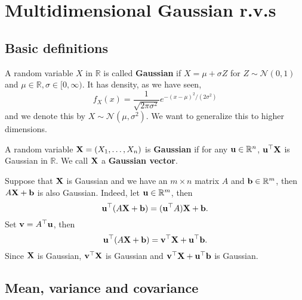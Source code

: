 \section{Multidimensional Gaussian r.v.s}
\subsection{Basic definitions}
\begin{definition}
    A random variable $X$ in $\mathbb R$ is called \textbf{Gaussian} if $X=\mu+\sigma Z$ for $Z\sim\mathcal N(0,1)$ and $ \mu\in \mathbb{R}, \sigma\in [0,\infty) $.
    It has density, as we have seen,
    $$f_X(x)=\frac{1}{\sqrt{2\pi\sigma^2}}e^{-(x-\mu)^2/(2\sigma^2)}$$
    and we denote this by $X\sim\mathcal N(\mu,\sigma^2)$.
    We want to generalize this to higher dimensions.
\end{definition}
\begin{definition}
    A random variable ${\bf X}=(X_1,\ldots,X_n)$ is \textbf{Gaussian} if for any ${\bf u}\in\mathbb R^n$, ${\bf u}^\top {\bf X}$ is Gaussian in $\mathbb R$.
    We call ${\bf X}$ a \textbf{Gaussian vector}.
\end{definition}

\begin{example}
    Suppose that $ {\bf X} $ is Gaussian and we have an $m\times n$ matrix $A$ and ${\bf b}\in\mathbb R^m$, then $A{\bf X}+{\bf b}$ is also Gaussian. Indeed, let $ {\bf u}\in \mathbb{R}^{m} $, then 
    \[
        {\bf u}^\top (A{\bf X}+{\bf b}) = ({\bf u}^\top A){\bf X}+{\bf b}.
    \]
    Set $ {\bf v} = A^\top {\bf u} $, then 
    \[
        {\bf u}^\top (A{\bf X}+{\bf b}) = {\bf v}^\top {\bf X} + {\bf u}^\top {\bf b}.
    \]
    Since ${\bf X}$ is Gaussian, $ {\bf v}^\top {\bf X} $ is Gaussian and $ {\bf v}^\top {\bf X} + {\bf u}^\top {\bf b} $ is Gaussian.
\end{example}
\subsection{Mean, variance and covariance}

